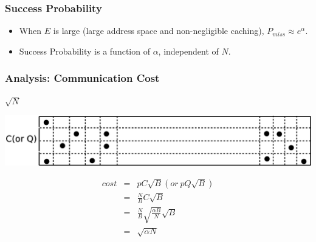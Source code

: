 \documentclass[red]{beamer}
\begin{document}
\begin{frame}
\frametitle{Success Probability}
\begin{itemize}
\item When $E$ is large (large address space and non-negligible caching),
$P_{miss} \approx e^{\alpha}$.
\item Success Probability is a function of $\alpha$, independent of $N$.
\end{itemize}
\end{frame}
\begin{frame}
\frametitle{Analysis: Communication Cost}
\begin{center}
$\sqrt{N}$
\end{center}
\center
\includegraphics[scale=0.25]{figs/cost_area}

\begin{eqnarray*}\label{th}
cost &=& pC\sqrt{B}  (or\  pQ\sqrt{B})\\
  &=& \frac{N}{B}C\sqrt{B}\\
  &=& \frac{N}{B}\sqrt{\frac{\alpha B}{N}}\sqrt{B}\\
  &=& \sqrt{\alpha N}
\end{eqnarray*}
\end{frame}
\end{document}
